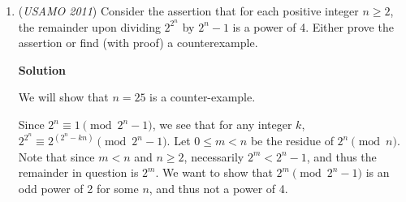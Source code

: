 \begin{enumerate}
Simplifying, this becomes
 \begin{align*} &ac(2b-a-c)[c(c-e)(c-b)-a(a-e)(a-b)][a^2(c\overline{e}-1)+c^2(a\overline{e}-1)]\\ &=[c(e-c)+a(e-a)]^2[c^3(a\overline{e}-1)(a-b)-a^3(c\overline{e}-1)(c-b)]. \end{align*}
Of course, we can also "conjugate" this equation -- a nice way to do this is to note that if
 \[x=\frac{(a-b)[c(e-c)+a(e-a)]}{c(c-e)(c-b)-a(a-e)(a-b)},\]then
 \[\frac{a(2b-a-c)}{c(e-c)+a(e-a)}=\frac{x}{\overline{x}}=\overline{\left(\frac{c(e-c)+a(e-a)}{a(2b-a-c)}\right)}=\frac{\frac{1}{c}\left(\overline{e}-\frac{1}{c}\right)+\frac{1}{a}\left(\overline{e}-\frac{1}{a}\right)}{\frac{1}{a}\left(\frac{2}{b}-\frac{1}{a}-\frac{1}{c}\right)},\]whence
 \[ac(2b-a-c)[2ac-b(a+c)]=b[c(e-c)+a(e-a)][a^2(c\overline{e}-1)+c^2(a\overline{e}-1)].\]If $a+c\ne 0$, then eliminating $\overline{e}$, we get
 \[e\in\left\{a+c-\frac{ac}{b},a+\frac{2c(c-b)}{a+c},c+\frac{2a(a-b)}{a+c}\right\}.\]The first case corresponds to (*) (since $a,b,c,e$ uniquely determine $d$ and $f$), the second corresponds to $AB\parallel DE$ (or equivalently, since $AB=DE$, $a-b=e-d$), and by symmetry, the third corresponds to $CB\parallel FE$.

 Otherwise, if $c=-a$, then we easily find $b^2e=a^4\overline{e}$ from the first of the two equations in $e,\overline{e}$ (we actually don't need this, but it tells us that the locus of working $e$ is a line through the origin). It's easy to compute $d=e+\frac{a(a-b)}{b}$ and $f=e+\frac{a(a+b)}{b}$, so $a-c=2a=f-d\implies c-d=a-f\implies CD\parallel AF$, and we're done.

 \textbf{Comment.} It appears that taking $(ABC)$ the unit circle is nicer than, say $e=0$ or $(ACE)$ the unit circle (which may not even be reasonably tractable).

 


	\item (\textit{USAMO 2011}) Consider the assertion that for each positive integer $n \ge 2$, the remainder upon dividing $2^{2^n}$ by $2^n - 1$ is a power of 4.  Either prove the assertion or find (with proof) a counterexample.


 



\textbf{Solution}

We will show that $n = 25$ is a counter-example.

 Since $\textstyle 2^n \equiv 1 \pmod{2^n - 1}$, we see that for any integer $k$, $\textstyle 2^{2^n} \equiv 2^{(2^n - kn)} \pmod{2^n-1}$. Let $0 \le m < n$ be the residue of $2^n \pmod n$. Note that since $\textstyle m < n$ and $\textstyle n \ge 2$, necessarily $\textstyle 2^m < 2^n -1$, and thus the remainder in question is $\textstyle 2^m$. We want to show that $\textstyle 2^m \pmod {2^n-1}$ is an odd power of 2 for some $\textstyle n$, and thus not a power of 4.


\end{enumerate}
